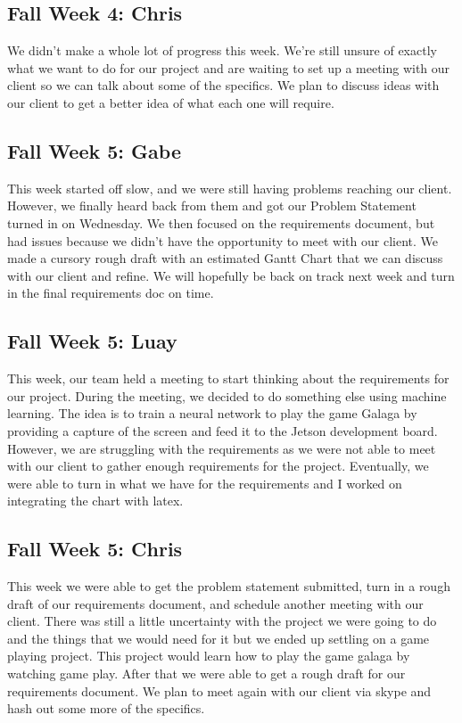 \documentclass[onecolumn, draftclsnofoot,10pt, compsoc]{IEEEtran}
\begin{document}
\subsection{Fall Week 4: Chris}
We didn't make a whole lot of progress this week. We're still unsure of exactly what we want to do for our project and are waiting to set up a meeting with our client so we can talk about some of the specifics. We plan to discuss ideas with our client to get a better idea of what each one will require.
\subsection{Fall Week 5: Gabe}
This week started off slow, and we were still having problems reaching our client. However, we finally heard back from them and got our Problem Statement turned in on Wednesday. We then focused on the requirements document, but had issues because we didn't have the opportunity to meet with our client. We made a cursory rough draft with an estimated Gantt Chart that we can discuss with our client and refine. We will hopefully be back on track next week and turn in the final requirements doc on time.
\subsection{Fall Week 5: Luay}
This week, our team held a meeting to start thinking about the requirements for our project. During the meeting, we decided to do something else using machine learning. The idea is to train a neural network to play the game Galaga by providing a capture of the screen and feed it to the Jetson development board. However, we are struggling with the requirements as we were not able to meet with our client to gather enough requirements for the project. Eventually, we were able to turn in what we have for the requirements and I worked on integrating the chart with latex.
\subsection{Fall Week 5: Chris}
This week we were able to get the problem statement submitted, turn in a rough draft of our requirements document, and schedule another meeting with our client. There was still a little uncertainty with the project we were going to do and the things that we would need for it but we ended up settling on a game playing project. This project would learn how to play the game galaga by watching game play. After that we were able to get a rough draft for our requirements document. We plan to meet again with our client via skype and hash out some more of the specifics.
\end{document}
